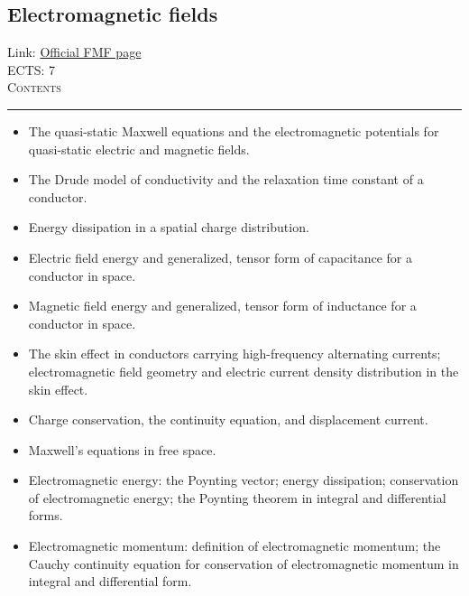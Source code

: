 \documentclass[11pt, a4paper]{article}
\newenvironment{course}[3]{
\subsection{#1}%
Link: \href{#2}{Official FMF page}\\%
ECTS: #3%
\vspace{1ex}
\\
{\large \textsc{Contents}}\\[-0.9ex]%
\rule{\textwidth}{0.5pt}
\vspace{-3ex}
}
{}
\newenvironment{chapter}[1]{
\begin{tcolorbox}[title=#1, breakable]
}
{\end{tcolorbox}}
\begin{document}
\begin{course}{Electromagnetic fields}{https://www.fmf.uni-lj.si/en/study-physics/programmes/1fiz/2020/7000777/courses/1133/}{7}
\begin{chapter}{Quasi-static electromagnetic fields}
\begin{itemize}
            \item The quasi-static Maxwell equations and the electromagnetic potentials for quasi-static electric and magnetic fields.

        \end{itemize}
    \end{chapter}

    \begin{chapter}{Conductors and Ohm's law}
        \begin{itemize}
        
            \item The Drude model of conductivity and the relaxation time constant of a conductor.

            \item Energy dissipation in a spatial charge distribution.

            \item Electric field energy and generalized, tensor form of capacitance for a conductor in space.

            \item Magnetic field energy and generalized, tensor form of inductance for a conductor in space.

            \item The skin effect in conductors carrying high-frequency alternating currents; electromagnetic field geometry and electric current density distribution in the skin effect.
        
        \end{itemize}
    \end{chapter}

    \begin{chapter}{Maxwell's equations in free space}
        \begin{itemize}
        
            \item Charge conservation, the continuity equation, and displacement current.

            \item Maxwell's equations in free space.

            \item Electromagnetic energy: the Poynting vector; energy dissipation; conservation of electromagnetic energy; the Poynting theorem in integral and differential forms.

            \item Electromagnetic momentum: definition of electromagnetic momentum; the Cauchy continuity equation for conservation of electromagnetic momentum in integral and differential form.


\end{itemize}
\end{chapter}
\end{course}
\end{document}
